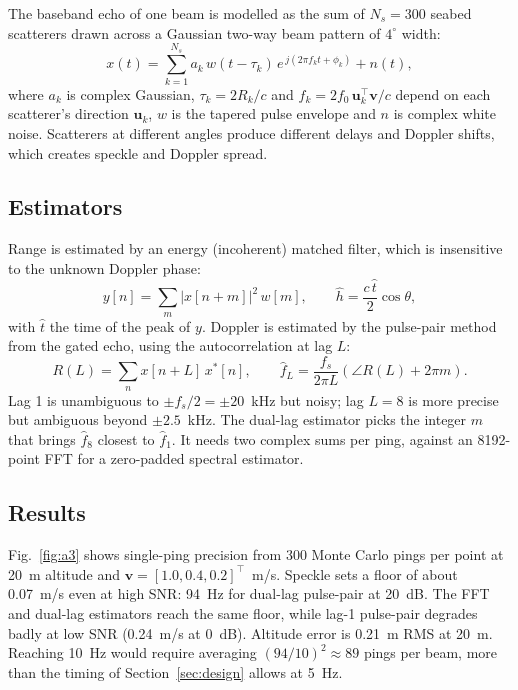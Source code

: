 \documentclass[conference]{IEEEtran}
\newcommand{\vect}[1]{\mathbf{#1}}
\begin{document}
The baseband echo of one beam is modelled as the sum of $N_s=300$ seabed scatterers drawn across a Gaussian two-way beam pattern of $4^\circ$ width:
\begin{equation}
x(t)=\sum_{k=1}^{N_s}a_k\,w(t-\tau_k)\,e^{\,j(2\pi f_k t+\phi_k)}+n(t),
\end{equation}
where $a_k$ is complex Gaussian, $\tau_k=2R_k/c$ and $f_k=2f_0\,\vect u_k^\top\vect v/c$ depend on each scatterer's direction $\vect u_k$, $w$ is the tapered pulse envelope and $n$ is complex white noise. Scatterers at different angles produce different delays and Doppler shifts, which creates speckle and Doppler spread.

\subsection{Estimators}

Range is estimated by an energy (incoherent) matched filter, which is insensitive to the unknown Doppler phase:
\begin{equation}
y[n]=\sum_m |x[n+m]|^2\,w[m],\qquad \hat h=\frac{c\,\hat t}{2}\cos\theta ,
\end{equation}
with $\hat t$ the time of the peak of $y$. Doppler is estimated by the pulse-pair method from the gated echo, using the autocorrelation at lag $L$:
\begin{equation}
R(L)=\sum_n x[n+L]\,x^*[n],\qquad \hat f_L=\frac{f_s}{2\pi L}\left(\angle R(L)+2\pi m\right).
\label{eq:pp}
\end{equation}
Lag 1 is unambiguous to $\pm f_s/2=\pm20$~kHz but noisy; lag $L=8$ is more precise but ambiguous beyond $\pm2.5$~kHz. The dual-lag estimator picks the integer $m$ that brings $\hat f_8$ closest to $\hat f_1$. It needs two complex sums per ping, against an 8192-point FFT for a zero-padded spectral estimator.

\subsection{Results}

Fig.~\ref{fig:a3} shows single-ping precision from 300 Monte Carlo pings per point at 20~m altitude and $\vect v=[1.0,0.4,0.2]^\top$~m/s. Speckle sets a floor of about 0.07~m/s even at high SNR: 94~Hz for dual-lag pulse-pair at 20~dB. The FFT and dual-lag estimators reach the same floor, while lag-1 pulse-pair degrades badly at low SNR (0.24~m/s at 0~dB). Altitude error is 0.21~m RMS at 20~m. Reaching 10~Hz would require averaging $(94/10)^2\approx89$ pings per beam, more than the timing of Section~\ref{sec:design} allows at 5~Hz.
\end{document}
